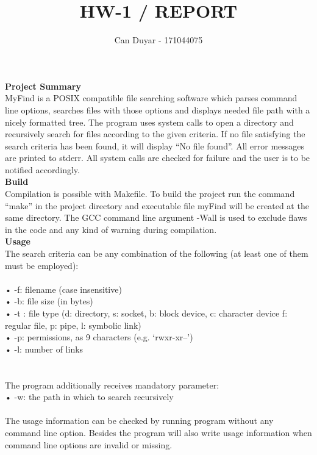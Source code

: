 \documentclass[a4 paper]{article}
\title{HW-1 / REPORT}
\author{ Can Duyar - 171044075}
\begin{document}
\date{}
\maketitle

{\color{red}\large\textbf {Project Summary}}\newline\\
\phantom{beta} MyFind is a POSIX compatible file searching software which parses command line options, searches files with those options and displays needed file path with a nicely formatted tree. The program uses system calls to open a directory and recursively search for files according to the given criteria. 
If no file satisfying the search criteria has been found, it will display “No file found”. All error messages are printed to stderr. All system calls are checked for failure and the user is to be notified accordingly.\\
 

{\color{red}\large\textbf {Build}}\newline\\
\phantom{beta} Compilation is possible with Makefile. To build the project run the command “make” in the project directory and executable file myFind will be created at the same directory. The GCC command line argument -Wall is used to exclude flaws in the code and any kind of warning during compilation.\\

{\color{red}\large\textbf {Usage}}\newline\\
\phantom{beta} The search criteria can be any combination of the following (at least one of them must be employed):\\\\
    • -f: filename (case insensitive)\\
    • -b: file size (in bytes)\\
    • -t : file type (d: directory, s: socket, b: block device, c: character device f: regular file, p: pipe, l: symbolic link)\\
    • -p: permissions, as 9 characters (e.g. ‘rwxr-xr--’)\\
    • -l: number of links\\\\\\
The program additionally receives mandatory parameter:\\
    • -w: the path in which to search recursively\\\\
\phantom{beta} The usage information can be checked by running program without any command line option. Besides the program will also write usage information when command line options are invalid or missing.\\\\\\\\
\end{document}
